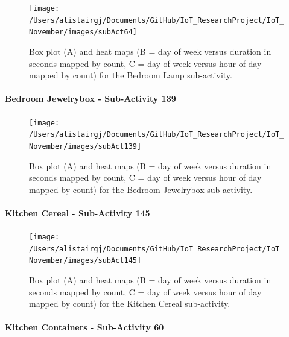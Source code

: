 \documentclass[11pt,]{article}
\let\oldparagraph\paragraph
\renewcommand{\paragraph}[1]{\oldparagraph{#1}\mbox{}}
\begin{document}
\begin{figure}[H]

{\centering \texttt{[image: /Users/alistairgj/Documents/GitHub/IoT\_ResearchProject/IoT\_November/images/subAct64]} 

}

\caption{Box plot (A) and heat maps (B = day of week versus duration in seconds mapped by count, C = day of week versus hour of day mapped by count) for the Bedroom Lamp sub-activity.}\label{fig:subAct64}
\end{figure}

\hypertarget{bedroom-jewelrybox---sub-activity-139}{%
\paragraph{Bedroom Jewelrybox - Sub-Activity
139}\label{bedroom-jewelrybox---sub-activity-139}}

\begin{figure}[H]

{\centering \texttt{[image: /Users/alistairgj/Documents/GitHub/IoT\_ResearchProject/IoT\_November/images/subAct139]} 

}

\caption{Box plot (A) and heat maps (B = day of week versus duration in seconds mapped by count, C = day of week versus hour of day mapped by count) for the Bedroom Jewelrybox sub activity.}\label{fig:subAct139}
\end{figure}

\hypertarget{kitchen-cereal---sub-activity-145}{%
\paragraph{Kitchen Cereal - Sub-Activity
145}\label{kitchen-cereal---sub-activity-145}}

\begin{figure}[H]

{\centering \texttt{[image: /Users/alistairgj/Documents/GitHub/IoT\_ResearchProject/IoT\_November/images/subAct145]} 

}

\caption{Box plot (A) and heat maps (B = day of week versus duration in seconds mapped by count, C = day of week versus hour of day mapped by count) for the Kitchen Cereal sub-activity.}\label{fig:subAct145}
\end{figure}

\hypertarget{kitchen-containers---sub-activity-60}{%
\paragraph{Kitchen Containers - Sub-Activity
60}\label{kitchen-containers---sub-activity-60}}
\end{document}
